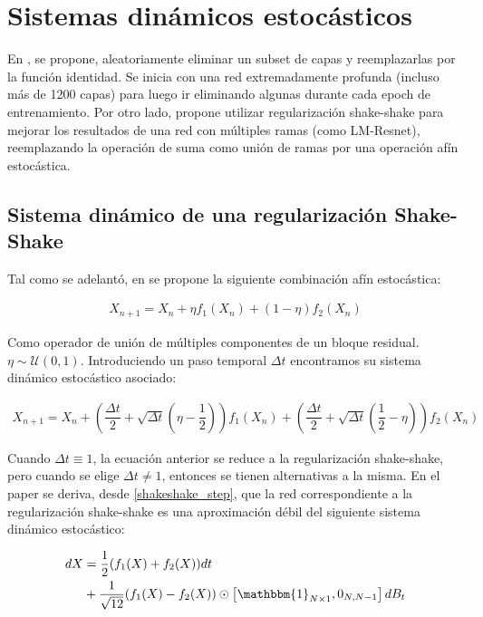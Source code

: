 \documentclass[titlepage,a4paper,oneside]{article}
\begin{document}
\section{Sistemas dinámicos estocásticos}
En \cite{huang2016deep}, se propone, aleatoriamente eliminar un subset de capas y reemplazarlas por la función identidad. Se inicia con una red extremadamente profunda (incluso más de 1200 capas) para luego ir eliminando algunas durante cada epoch de entrenamiento. Por otro lado, \cite{gastaldi2017shakeshake} propone utilizar regularización shake-shake para mejorar los resultados de una red con múltiples ramas (como LM-Resnet), reemplazando la operación de suma como unión de ramas por una operación afín estocástica.

\subsection{Sistema dinámico de una regularización Shake-Shake}
Tal como se adelantó, en \cite{gastaldi2017shakeshake} se propone la siguiente combinación afín estocástica:

\begin{align}
	X_{n+1} = X_n + \eta f_1(X_n) + (1-\eta) f_2 (X_n)
\end{align}

Como operador de unión de múltiples componentes de un bloque residual. $\eta \sim \mathscr{U}(0,1)$. Introduciendo un paso temporal $\Delta t$ encontramos su sistema dinámico estocástico asociado:

\begin{align}\label{shakeshake_step}
	X_{n+1} = X_n + \left(\dfrac{\Delta t}{2} + \sqrt{\Delta t}(\eta - \dfrac{1}{2})\right) f_1(X_n) + \left( \dfrac{\Delta t}{2} + \sqrt{\Delta t} (\dfrac{1}{2} - \eta) \right) f_2(X_n)
\end{align}

Cuando $\Delta t \equiv 1$, la ecuación anterior se reduce a la regularización shake-shake, pero cuando se elige $\Delta t \neq 1$, entonces se tienen alternativas a la misma. En el paper se deriva, desde \ref{shakeshake_step}, que la red correspondiente a la regularización shake-shake es una aproximación débil del siguiente sistema dinámico estocástico:

\begin{align}
	dX &= \dfrac{1}{2} (f_1(X) + f_2(X)) dt\\
	   &+ \dfrac{1}{\sqrt{12}} (f_1(X) - f_2(X)) \odot \left[ \mathbbm{1}_{N\times 1}, 0_{N,N-1} \right] dB_t
\end{align}
\end{document}

